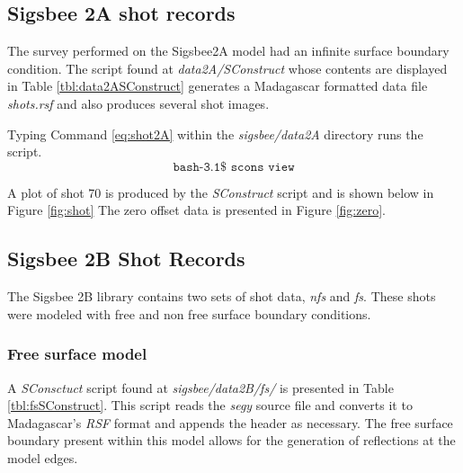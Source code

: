 \subsection{Sigsbee 2A shot records}
The survey performed on the Sigsbee2A model had an infinite surface boundary condition.  The script found at 
\emph{data2A/SConstruct} whose contents are displayed in Table \ref{tbl:data2ASConstruct} generates a Madagascar 
formatted data file \emph{shots.rsf} and also produces several shot images. 
  
{
\tiny

\normalsize
}

Typing Command \ref{eq:shot2A} within the \emph{sigsbee/data2A} directory runs the script.
\begin{equation}\label{eq:shot2A} \texttt{bash-3.1\$\ scons\ view} \end{equation}

A plot of shot 70  is produced by the \emph{SConstruct} script and is shown below in Figure \ref{fig:shot}  The zero offset 
data is presented in Figure \ref{fig:zero}.


\subsection{Sigsbee 2B Shot Records}
The Sigsbee 2B library contains two sets of shot data, \emph{nfs} and \emph{fs}.  These shots were modeled with free and non free surface 
boundary conditions.  

\subsubsection{Free surface model}  
A \emph{SConsctuct} script found at \textit{sigsbee/data2B/fs/} is presented in Table \ref{tbl:fsSConstruct}.  
This script reads the \emph{segy} source file and converts it to Madagascar's \emph{RSF} format and appends the header as 
necessary.  The free surface boundary present within this model allows for the generation of reflections at the model edges.  

{
\tiny

\normalsize
}


